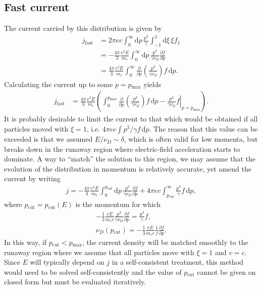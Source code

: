 \documentclass[11pt,a4paper]{article}
\newcommand{\rd}{\ensuremath{\mathrm{d}}}
\newcommand{\sub}[1]{\ensuremath{_{\text{#1}}}}
\begin{document}
\subsection{Fast current}
The current carried by this distribution is given by
\begin{align}
j \sub{fast} &=  2\pi ec\int_0^\infty \rd p \, \frac{p^3}{\gamma} \int_{-1}^1 \rd \xi \, \xi f_1   \nonumber \\
&= -\frac{4\pi}{3} \frac{e^2 E}{m_e} \int_0^\infty \rd p \, \frac{p^3 }{\gamma \nu_D}\frac{\partial f}{\partial p}  \nonumber \\
&= \frac{4\pi}{3} \frac{e^2 E}{m_e} \int_0^\infty  \frac{\partial}{\partial p}\left(\frac{p^3}{\gamma\nu_D}\right) f\,\rd p.
\end{align}
Calculating the current up to some $p=p\sub{max}$ yields
\begin{align}
j\sub{fast} &= \frac{4\pi}{3} \frac{e^2 E}{m_e} \left(\int_0^{p\sub{max}}  \frac{\partial}{\partial p}\left(\frac{p^3}{\gamma\nu_D}\right) f\,\rd p - \left.\frac{p^3}{\gamma\nu_D}f\right|_{p=p\sub{max}}\right).
\end{align}
It is probably desirable to limit the current to that which would be obtained if all particles moved with $\xi=1$, i.e. $4\pi ec \int p^3/\gamma f \, \rd p$. The reason that this value can be exceeded is that we assumed $E/\nu_D \sim \delta$, which is often valid for low momenta, but breaks down in the runaway region where electric-field acceleration starts to dominate. A way to ``match'' the solution to this region, we may assume that the evolution of the distribution in momentum is relatively accurate, yet amend the current by writing
\begin{align}
j = -\frac{4\pi}{3} \frac{e^2 E}{m_e} \int_0^{p\sub{cut}} \rd p \, \frac{p^3 }{\gamma \nu_D}\frac{\partial f}{\partial p}  + 4\pi ec \int_{p\sub{cut}}^\infty \frac{p^3}{\gamma }f \, \rd p,
\end{align}
where $p\sub{cut}=p\sub{cut}(E)$ is the momentum for which
\begin{align}
-\frac{1}{3}\frac{eE}{m_e c} \frac{p^3}{\gamma\nu_D}\frac{\partial f}{\partial p} = \frac{p^3}{\gamma} f, \nonumber \\
\nu_D(p\sub{cut}) = -\frac{1}{3}\frac{eE}{m_e c} \frac{1}{f}\frac{\partial f}{\partial p}.
\end{align}
In this way, if $p\sub{cut} < p\sub{max}$, the current density will be matched smoothly to the runaway region where we assume that all particles move with $\xi=1$ and $v=c$.
Since $E$ will typically depend on $j$ in a self-consistent treatment, this method would need to be solved self-consistently and the value of $p\sub{cut}$ cannot be given on closed form but must be evaluated iteratively.
\end{document}
